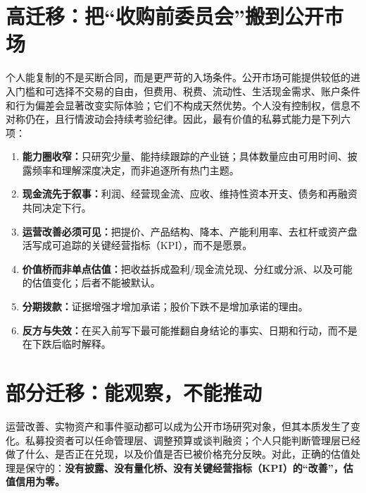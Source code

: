 \section{高迁移：把“收购前委员会”搬到公开市场}

个人能复制的不是买断合同，而是更严苛的入场条件。公开市场可能提供较低的进入门槛和可选择不交易的自由，但费用、税费、流动性、生活现金需求、账户条件和行为偏差会显著改变实际体验；它们不构成天然优势。个人没有控制权，信息不对称仍在，且行情波动会持续考验纪律。因此，最有价值的私募式能力是下列六项：

\begin{enumerate}
  \item \textbf{能力圈收窄：}只研究少量、能持续跟踪的产业链；具体数量应由可用时间、披露频率和理解深度决定，而非追逐所有热门主题。
  \item \textbf{现金流先于叙事：}利润、经营现金流、应收、维持性资本开支、债务和再融资共同决定下行。
  \item \textbf{运营改善必须可见：}把提价、产品结构、降本、产能利用率、去杠杆或资产盘活写成可追踪的关键经营指标（KPI），而不是愿景。
  \item \textbf{价值桥而非单点估值：}把收益拆成盈利/现金流兑现、分红或分派、以及可能的估值变化；后者不能被默认。
  \item \textbf{分期拨款：}证据增强才增加承诺；股价下跌不是增加承诺的理由。
  \item \textbf{反方与失效：}在买入前写下最可能推翻自身结论的事实、日期和行动，而不是在下跌后临时解释。
\end{enumerate}

\section{部分迁移：能观察，不能推动}

运营改善、实物资产和事件驱动都可以成为公开市场研究对象，但其本质发生了变化。私募投资者可以任命管理层、调整预算或谈判融资；个人只能判断管理层已经做了什么、是否正在兑现，以及价值是否已被价格充分反映。对此，正确的估值处理是保守的：\textbf{没有披露、没有量化桥、没有关键经营指标（KPI）的“改善”，估值信用为零。}

